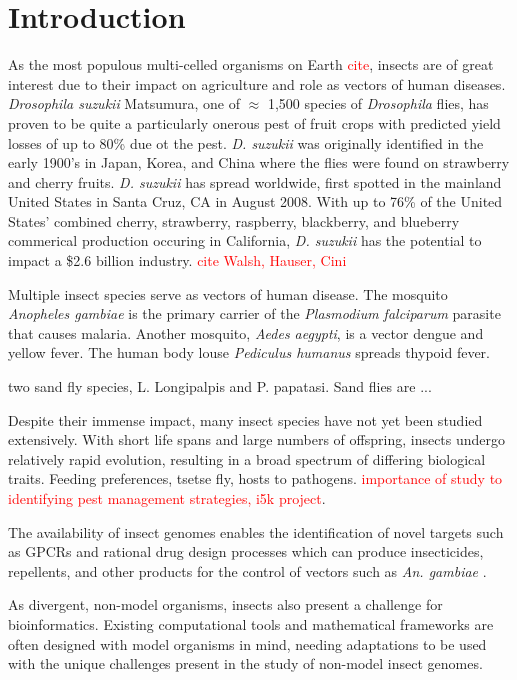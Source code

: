 \section{Introduction}
As the most populous multi-celled organisms on Earth \textcolor{red}{cite}, insects are of great interest due to their impact on agriculture and role as vectors of human diseases.  \emph{Drosophila suzukii} Matsumura, one of $\approx$ 1,500 species of \emph{Drosophila} flies, has proven to be quite a particularly onerous pest of fruit crops with predicted yield losses of up to 80\% due ot the pest.  \emph{D. suzukii} was originally identified in the early 1900's in Japan, Korea, and China where the flies were found on strawberry and cherry fruits. \emph{D. suzukii} has spread worldwide, first spotted in the mainland United States in Santa Cruz, CA in August 2008. With up to 76\% of the United States' combined cherry, strawberry, raspberry, blackberry, and blueberry commerical production occuring in California, \emph{D. suzukii} has the potential to impact a \$2.6 billion industry. \textcolor{red}{cite Walsh, Hauser, Cini}  

Multiple insect species serve as vectors of human disease.  The mosquito \emph{Anopheles gambiae} is the primary carrier of the \emph{Plasmodium falciparum} parasite that causes malaria. Another mosquito, \emph{Aedes aegypti}, is a vector dengue and yellow fever. The human body louse \emph{Pediculus humanus} spreads thypoid fever. \cite{Fournier2002, Foucault2006, Grimmelikhuijzen2007}

two sand fly species, L. Longipalpis and P. papatasi. Sand flies are ...

Despite their immense impact, many insect species have not yet been studied extensively.  With short life spans and large numbers of offspring, insects undergo relatively rapid evolution, resulting in a broad spectrum of differing biological traits. Feeding preferences, tsetse fly, hosts to pathogens. \textcolor{red}{importance of study to identifying pest management strategies, i5k project}.

The availability of insect genomes enables the identification of novel targets such as GPCRs and rational drug design processes which can produce insecticides, repellents, and other products for the control of vectors such as \emph{An. gambiae} \cite{Grimmelikhuijzen2007, Justice2003}.

As divergent, non-model organisms, insects also present a challenge for bioinformatics. Existing computational tools and mathematical frameworks are often designed with model organisms in mind, needing adaptations to be used with the unique challenges present in the study of non-model insect genomes.

